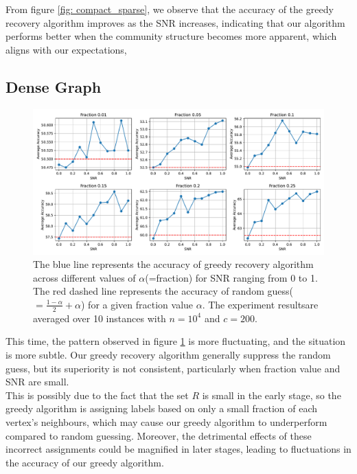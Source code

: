 From figure \ref{fig: compact_sparse}, we observe that the accuracy of the greedy recovery algorithm improves as the SNR increases, indicating that our algorithm performs better when the community structure becomes more apparent, which aligns with our expectations,
\subsection{Dense Graph}
\begin{figure}[H]
    \centering
    \includegraphics[width=1\linewidth]{Figures/Greedy_Recovery_super_dense_3.pdf}
    \caption[Accuracy of Greedy Recovery Algorithm in Dense Graph with $k=2$]{The blue line represents the accuracy of greedy recovery algorithm across different values of $\alpha$(=fraction) for SNR ranging from 0 to 1. The red dashed line represents the accuracy of random guess($=\frac{1-\alpha}{2}+\alpha$) for a given fraction value $\alpha$. The experiment results\protect\footnotemark are averaged over 10 instances with $n=10^4$ and $c=200.$}
    \label{fig:greedy_dense}
\end{figure}
This time, the pattern observed in figure \ref{fig:greedy_dense} is more fluctuating, and the situation is more subtle. Our greedy recovery algorithm generally suppress the random guess, but its superiority is not consistent, particularly when fraction value and SNR are small.\\
This is possibly due to the fact that the set $R$ is small in the early stage, so the greedy algorithm is assigning labels based on only a small fraction of each vertex's neighbours, which may cause our greedy algorithm to underperform compared to random guessing. Moreover, the detrimental effects of these incorrect assignments could be magnified in later stages, leading to fluctuations in the accuracy of our greedy algorithm.
\clearpage
